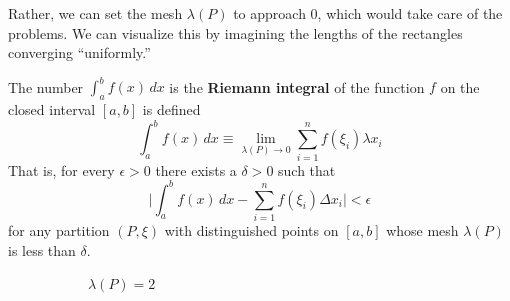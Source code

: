     Rather, we can set the mesh $\lambda(P)$ to approach $0$, which would take care of the problems. We can visualize this by imagining the lengths of the rectangles converging ``uniformly.''

    \begin{definition}
      The number $\int_a^b f(x)\,dx$ is the \textbf{Riemann integral} of the function $f$ on the closed interval $[a, b]$ is defined 
      \[\int_a^b f(x)\,dx \equiv \lim_{\lambda(P) \rightarrow 0} \sum_{i=1}^n f(\xi_i) \lambda x_i\]
      That is, for every $\epsilon>0$ there exists a $\delta>0$ such that
      \[\Bigg| \int_a^b f(x)\,dx - \sum_{i=1}^n f(\xi_i) \Delta x_i \Bigg| < \epsilon\]
      for any partition $(P, \xi)$ with distinguished points on $[a, b]$ whose mesh $\lambda(P)$ is less than $\delta$. 

      \begin{figure}[H]
        \centering
        \begin{subfigure}[b]{0.32\textwidth}
          \centering
          \caption{$\lambda(P) = 2$}
        \end{subfigure}
        \hfill 
        \begin{subfigure}[b]{0.32\textwidth}
          \centering
\end{subfigure}
\end{figure}
\end{definition}
